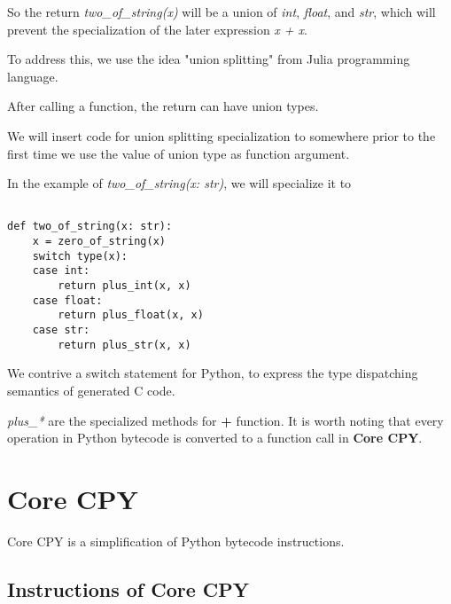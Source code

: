 \documentclass[12pt, a4paper]{report}
\begin{document}
So the return \textit{two\_of\_string(x)} will be a union of \textit{int}, \textit{float}, and \textit{str},
which will prevent the specialization of the later expression \textit{x + x}.

To address this, we use the idea "union splitting" from Julia programming language. %

After calling a function, the return can have union types.

We will insert code for union splitting specialization to somewhere prior to the first time we use the value of union type as function argument.

In the example of \textit{two\_of\_string(x: str)}, we will specialize it to

\begin{lstlisting}

def two_of_string(x: str):
    x = zero_of_string(x)
    switch type(x):
    case int:
        return plus_int(x, x)
    case float:
        return plus_float(x, x)
    case str:
        return plus_str(x, x)

\end{lstlisting}

We contrive a switch statement for Python, to express the type dispatching semantics of generated C code.

\textit{plus\_*} are the specialized methods for \textbf{+} function. It is worth noting that every operation in Python bytecode is converted to
a function call in \textbf{Core CPY}.


\section*{Core CPY}

Core CPY is a simplification of Python bytecode instructions.

\subsection*{Instructions of Core CPY}

\begin{bnf*}
    \\
    \\
    \\
    \\
    \\
     \\
     \\
     \\
     \\
\end{bnf*}
\end{document}
